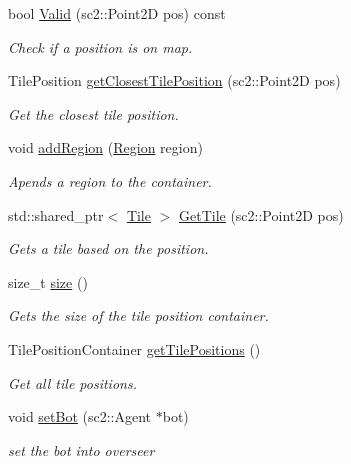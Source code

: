 \begin{DoxyCompactItemize}
bool \hyperlink{classOverseer_1_1Map_a0cd63b3a16beab9b4cf01aa1b6adad8f}{Valid} (sc2\+::\+Point2D pos) const 
\begin{DoxyCompactList}\small\item\em Check if a position is on map. \end{DoxyCompactList}\item 
Tile\+Position \hyperlink{classOverseer_1_1Map_aebebc1ac43ea86747ebc38f2ee0d821d}{get\+Closest\+Tile\+Position} (sc2\+::\+Point2D pos)
\begin{DoxyCompactList}\small\item\em Get the closest tile position. \end{DoxyCompactList}\item 
void \hyperlink{classOverseer_1_1Map_afa19b5f826a5a4d37258e000bfa646a9}{add\+Region} (\hyperlink{classOverseer_1_1Region}{Region} region)
\begin{DoxyCompactList}\small\item\em Apends a region to the container. \end{DoxyCompactList}\item 
std\+::shared\+\_\+ptr$<$ \hyperlink{classOverseer_1_1Tile}{Tile} $>$ \hyperlink{classOverseer_1_1Map_a7df832c0a80c21cd79a18df2158f3989}{Get\+Tile} (sc2\+::\+Point2D pos)
\begin{DoxyCompactList}\small\item\em Gets a tile based on the position. \end{DoxyCompactList}\item 
size\+\_\+t \hyperlink{classOverseer_1_1Map_a29777413d8ac109aeb6f974a7b2fc25c}{size} ()
\begin{DoxyCompactList}\small\item\em Gets the size of the tile position container. \end{DoxyCompactList}\item 
Tile\+Position\+Container \hyperlink{classOverseer_1_1Map_a9e3000cfd9170cc7f6a70988fccd3af9}{get\+Tile\+Positions} ()
\begin{DoxyCompactList}\small\item\em Get all tile positions. \end{DoxyCompactList}\item 
void \hyperlink{classOverseer_1_1Map_a5fe859c4edbfc92971ad2ad38d69ff90}{set\+Bot} (sc2\+::\+Agent $\ast$bot)
\begin{DoxyCompactList}\small\item\em set the bot into overseer \end{DoxyCompactList}\item 

\end{DoxyCompactItemize}
